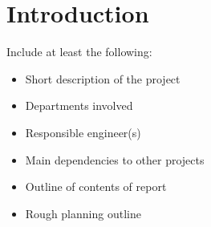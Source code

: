 \chapter{Introduction} \label{chapter:intro}
Include at least the following:
\begin{itemize}
    \item Short description of the project
    \item Departments involved
    \item Responsible engineer(s)
    \item Main dependencies to other projects
    \item Outline of contents of report
    \item Rough planning outline 
\end{itemize} 
